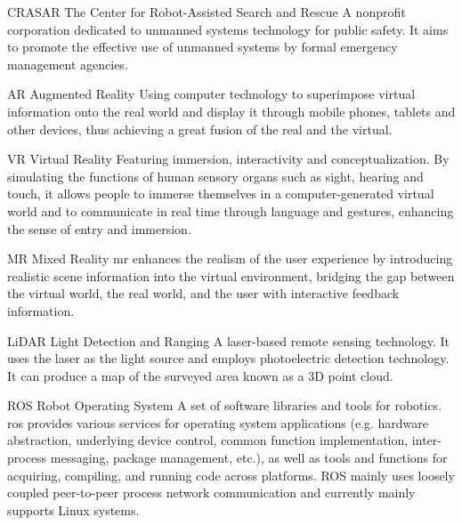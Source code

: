 
{CRASAR}            %
{The Center for Robot-Assisted Search and Rescue}  %
{\glsresetall A nonprofit corporation dedicated to unmanned systems technology for public safety. It aims to promote the effective use of unmanned systems by formal emergency management agencies.
}%


{AR}            %
{Augmented Reality}  %
{\glsresetall Using computer technology to superimpose virtual information onto the real world and display it through mobile phones, tablets and other devices, thus achieving a great fusion of the real and the virtual.
}%


{VR}            %
{Virtual Reality}  %
{\glsresetall Featuring immersion, interactivity and conceptualization. By simulating the functions of human sensory organs such as sight, hearing and touch, it allows people to immerse themselves in a computer-generated virtual world and to communicate in real time through language and gestures, enhancing the sense of entry and immersion.
}%

{MR}            %
{Mixed Reality}  %
{\glsresetall \gls{mr} enhances the realism of the user experience by introducing realistic scene information into the virtual environment, bridging the gap between the virtual world, the real world, and the user with interactive feedback information.
}%


{LiDAR}            %
{Light Detection and Ranging}  %
{\glsresetall A laser-based remote sensing technology. It uses the laser as the light source and employs photoelectric detection technology. It can produce a map of the surveyed area known as a 3D point cloud.
}%


{ROS}            %
{Robot Operating System}  %
{\glsresetall A set of software libraries and tools for robotics. \gls{ros} provides various services for operating system applications (e.g.  hardware abstraction, underlying device control, common function implementation, inter-process messaging, package management, etc.), as well as tools and functions for acquiring, compiling, and running code across platforms. ROS mainly uses loosely coupled peer-to-peer process network communication and currently mainly supports Linux systems.
}%

